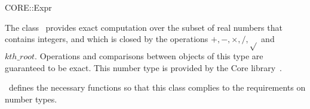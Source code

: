 \ccDefGlobalScope{}
\begin{ccRefClass}{CORE::Expr}

\ccDefinition

The class \ccRefName\ provides exact computation over the subset of real
numbers that contains integers, and which is closed by the operations
$+,-,\times,/,\sqrt{}$ and $kth\_root$.  Operations and comparisons 
between objects of this type are guaranteed to be exact.  
This number type is provided by the
{\sc Core} library~\cite{klpy-clp-99}.

\cgal\ defines the necessary functions so that this class complies to the
requirements on number types.


\ccIsModel
{}\\
\\
\\

\end{ccRefClass}
